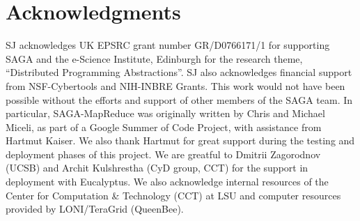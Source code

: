 \documentclass[conference,final]{IEEEtran}
\newcommand{\sagamapreduce }{SAGA-MapReduce }
\begin{document}





\section{Acknowledgments}

SJ acknowledges UK EPSRC grant number GR/D0766171/1 for supporting
SAGA and the e-Science Institute, Edinburgh for the research theme,
``Distributed Programming Abstractions''.  SJ also acknowledges
financial support from NSF-Cybertools and NIH-INBRE Grants. This work
would not have been possible without the efforts and support of other
members of the SAGA team.  In particular, \sagamapreduce was
originally written by Chris and Michael Miceli, as part of a Google
Summer of Code Project, with assistance from Hartmut Kaiser. We also
thank Hartmut for great support during the testing and deployment
phases of this project. We are greatful to Dmitrii Zagorodnov (UCSB)
and Archit Kulshrestha (CyD group, CCT) for the support in deployment
with Eucalyptus.  We also acknowledge internal resources of the Center
for Computation \& Technology (CCT) at LSU and computer resources
provided by LONI/TeraGrid (QueenBee).  

\end{document}
